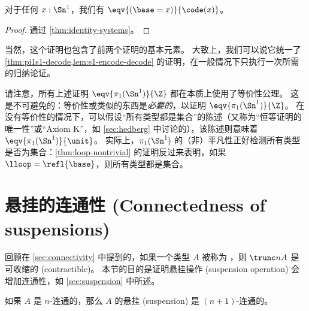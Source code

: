 \begin{cor}
  对于任何 $x:\Sn^1$，我们有 $\eqv{(\base=x)}{\code(x)}$。
\end{cor}
\begin{proof}
  通过 \cref{thm:identity-systems}。
\end{proof}

当然，这个证明也包含了前两个证明的基本元素。
大致上，我们可以说它统一了 \cref{thm:pi1s1-decode,lem:s1-encode-decode} 的证明，在一般情况下只执行一次所需的归纳论证。

\begin{rmk}
  请注意，所有上述证明 $\eqv{\pi_1(\Sn^1)}{\Z}$ 都在本质上使用了等价性公理。
  这是不可避免的：等价性或类似的东西是\emph{必要的}，以证明 $\eqv{\pi_1(\Sn^1)}{\Z}$。
  在没有等价性的情况下，可以假设“所有类型都是集合”的陈述（又称为“恒等证明的唯一性”或“Axiom K”，如 \cref{sec:hedberg} 中讨论的），该陈述则意味着 $\eqv{\pi_1(\Sn^1)}{\unit}$。
  实际上，$\pi_1(\Sn^1)$ 的（非）平凡性正好检测所有类型是否为集合：\cref{thm:loop-nontrivial} 的证明反过来表明，如果 $\lloop=\refl{\base}$，则所有类型都是集合。
\end{rmk}

\section{悬挂的连通性 (Connectedness of suspensions)}
\label{sec:conn-susp}

回顾在 \cref{sec:connectivity} 中提到的，如果一个类型 $A$ 被称为 ，则 $\trunc nA$ 是可收缩的 (contractible)。
本节的目的是证明悬挂操作 (suspension operation) 会增加连通性，如 \cref{sec:suspension} 中所述。

\begin{thm} \label{thm:suspension-increases-connectedness}
如果 $A$ 是 $n$-连通的，那么 $A$ 的悬挂 (suspension) 是 $(n+1)$-连通的。
\end{thm}


